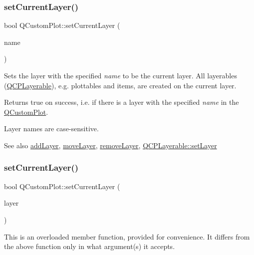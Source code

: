 \subsubsection{\texorpdfstring{set\+Current\+Layer()}{setCurrentLayer()}\hspace{0.1cm}{\footnotesize\ttfamily [1/2]}}
{\footnotesize\ttfamily bool Q\+Custom\+Plot\+::set\+Current\+Layer (\begin{DoxyParamCaption}\item[{const Q\+String \&}]{name }\end{DoxyParamCaption})}

Sets the layer with the specified {\itshape name} to be the current layer. All layerables (\hyperlink{classQCPLayerable}{Q\+C\+P\+Layerable}), e.\+g. plottables and items, are created on the current layer.

Returns true on success, i.\+e. if there is a layer with the specified {\itshape name} in the \hyperlink{classQCustomPlot}{Q\+Custom\+Plot}.

Layer names are case-\/sensitive.

\begin{DoxySeeAlso}{See also}
\hyperlink{classQCustomPlot_ad5255393df078448bb6ac83fa5db5f52}{add\+Layer}, \hyperlink{classQCustomPlot_ae896140beff19424e9e9e02d6e331104}{move\+Layer}, \hyperlink{classQCustomPlot_a40f75e342c5eaab6a86066a42a0e2a94}{remove\+Layer}, \hyperlink{classQCPLayerable_ab0d0da6d2de45a118886d2c8e16d5a54}{Q\+C\+P\+Layerable\+::set\+Layer} 
\end{DoxySeeAlso}
\mbox{\label{classQCustomPlot_a23a4d3cadad1a0063c5fe19aac5659e6}} 
\subsubsection{\texorpdfstring{set\+Current\+Layer()}{setCurrentLayer()}\hspace{0.1cm}{\footnotesize\ttfamily [2/2]}}
{\footnotesize\ttfamily bool Q\+Custom\+Plot\+::set\+Current\+Layer (\begin{DoxyParamCaption}\item[{\hyperlink{classQCPLayer}{Q\+C\+P\+Layer} $\ast$}]{layer }\end{DoxyParamCaption})}

This is an overloaded member function, provided for convenience. It differs from the above function only in what argument(s) it accepts.

